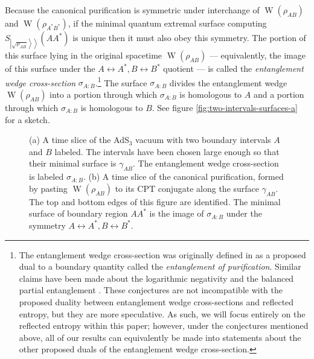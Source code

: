 \documentclass[a4paper,11pt]{article}
\newcommand{\W}{\operatorname{W}}
\newcommand{\kett}[1]{\left.\left| #1 \right\rangle \right\rangle}
\begin{document}
Because the canonical purification is symmetric under interchange of $\W(\rho_{AB})$ and $\W(\rho_{A^*B^*})$, if the minimal quantum extremal surface computing $S_{\kett{\sqrt{\rho_{AB}}}}(AA^*)$ is unique then it must also obey this symmetry. The portion of this surface lying in the original spacetime $\W(\rho_{AB})$ --- equivalently, the image of this surface under the $A \leftrightarrow A^*, B \leftrightarrow B^*$ quotient --- is called the \emph{entanglement wedge cross-section} $\sigma_{A:B}$.\footnote{The entanglement wedge cross-section was originally defined in \cite{EOP1, EOP2} as a proposed dual to a boundary quantity called the \emph{entanglement of purification}. Similar claims have been made about the logarithmic negativity \cite{kudler2019entanglement, kusuki2019derivation} and the balanced partial entanglement \cite{wen2021balanced}. These conjectures are not incompatible with the proposed duality between entanglement wedge cross-sections and reflected entropy, but they are more speculative. As such, we will focus entirely on the reflected entropy within this paper; however, under the conjectures mentioned above, all of our results can equivalently be made into statements about the other proposed duals of the entanglement wedge cross-section.} The surface $\sigma_{A:B}$ divides the entanglement wedge $\W(\rho_{AB})$ into a portion through which $\sigma_{A:B}$ is homologous to $A$ and a portion through which $\sigma_{A:B}$ is homologous to $B$. See figure \ref{fig:two-intervals-surfaces-a} for a sketch.

\begin{figure}
    \centering
    \caption{(a) A time slice of the AdS$_3$ vacuum with two boundary intervals $A$ and $B$ labeled. The intervals have been chosen large enough so that their minimal surface is $\gamma_{AB}$. The entanglement wedge cross-section is labeled $\sigma_{A:B}$. (b) A time slice of the canonical purification, formed by pasting $\W(\rho_{AB})$ to its CPT conjugate along the surface $\gamma_{AB}$. The top and bottom edges of this figure are identified. The minimal surface of boundary region $AA^*$ is the image of $\sigma_{A:B}$ under the symmetry $A \leftrightarrow A^*, B \leftrightarrow B^*$.}
    \label{fig:two-intervals-surfaces}
\end{figure}
\end{document}
